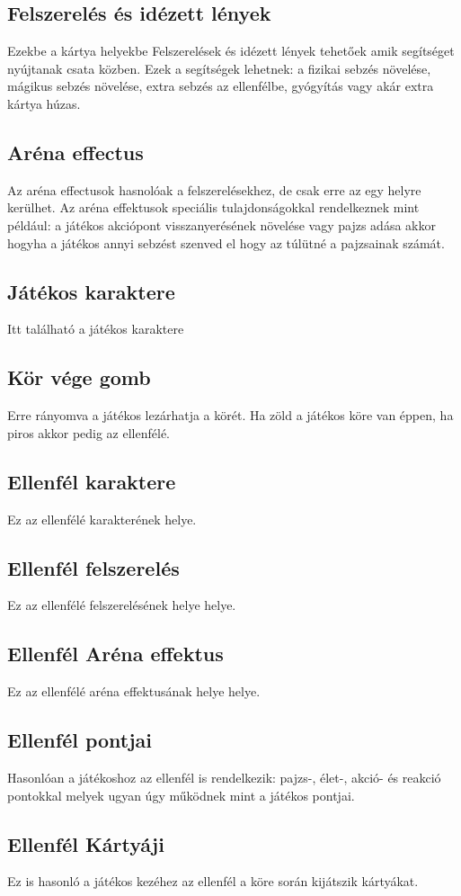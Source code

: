 \subsection{Felszerelés és idézett lények}
Ezekbe a kártya helyekbe Felszerelések és idézett lények tehetőek amik segítséget nyújtanak csata közben. Ezek a segítségek lehetnek: a fizikai sebzés növelése, mágikus sebzés növelése, extra sebzés az ellenfélbe, gyógyítás vagy akár extra kártya húzas. 
\subsection{Aréna effectus}
Az aréna effectusok hasnolóak a felszerelésekhez, de csak erre az egy helyre kerülhet. Az aréna effektusok speciális tulajdonságokkal rendelkeznek mint például: a játékos akciópont visszanyerésének növelése vagy pajzs adása akkor hogyha a játékos annyi sebzést szenved el hogy az túlütné a pajzsainak számát.
\subsection{Játékos karaktere}
Itt található a játékos karaktere
\subsection{Kör vége gomb}
Erre rányomva a játékos lezárhatja a körét. Ha zöld a játékos köre van éppen, ha piros akkor pedig az ellenfélé.
\subsection{Ellenfél karaktere}
Ez az ellenfélé karakterének helye.
\subsection{Ellenfél felszerelés}
Ez az ellenfélé felszerelésének helye helye.
\subsection{Ellenfél Aréna effektus}
Ez az ellenfélé aréna effektusának helye helye.
\subsection{Ellenfél pontjai}
Hasonlóan a játékoshoz az ellenfél is rendelkezik: pajzs-, élet-, akció- és reakció pontokkal melyek ugyan úgy működnek mint a játékos pontjai.
\subsection{Ellenfél Kártyáji}
Ez is hasonló a játékos kezéhez az ellenfél a köre során kijátszik kártyákat.
\clearpage

